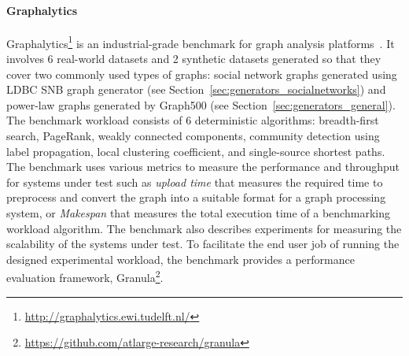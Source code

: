 \paragraph{Graphalytics} Graphalytics\footnote{\url{http://graphalytics.ewi.tudelft.nl/}} is an industrial-grade benchmark for graph analysis platforms~\cite{Iosup:2016:LGB:3007263.3007270}. It involves 6 real-world datasets and 2 synthetic datasets generated so that they cover two commonly used types of graphs: social network graphs generated using LDBC SNB graph generator (see Section~\ref{sec:generators_socialnetworks}) and power-law graphs generated by Graph500 (see Section~\ref{sec:generators_general}). The benchmark workload consists of 6 deterministic algorithms: breadth-first search, PageRank, weakly connected components, community detection using label propagation, local clustering coefficient, and single-source shortest paths. The benchmark uses various metrics to measure the performance and throughput for systems under test such as \emph{upload time} that measures the required time to preprocess and convert the graph into a suitable format for a graph processing system, or \emph{Makespan} that measures the total  execution time of a benchmarking workload algorithm. The benchmark also describes experiments for measuring the scalability of the systems under test. To facilitate the end user job of running the designed experimental workload, the benchmark provides  a performance evaluation framework, Granula\footnote{\url{https://github.com/atlarge-research/granula}}.%


